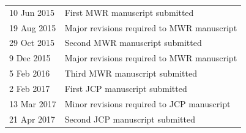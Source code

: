 \documentclass[a4paper,11pt]{article}
\begin{document}
\begin{tabular}{l l}
10 Jun 2015 & First MWR manuscript submitted \\
19 Aug 2015 & Major revisions required to MWR manuscript \\
29 Oct 2015 & Second MWR manuscript submitted\\
9 Dec 2015 & Major revisions required to MWR manuscript \\
5 Feb 2016 & Third MWR manuscript submitted
	\vspace*{1em} \\
2 Feb 2017 & First JCP manuscript submitted \\
13 Mar 2017 & Minor revisions required to JCP manuscript \\
21 Apr 2017 & Second JCP manuscript submitted \\
\end{tabular}
\end{document}
